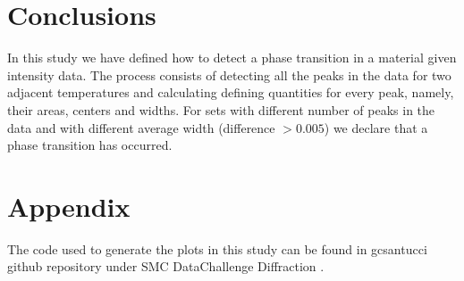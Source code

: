 

\section{Conclusions} \label{Conclusions}
	In this study we have defined how to detect a phase transition in a material given intensity data. The process consists of detecting all the peaks in the data for two adjacent temperatures and calculating defining quantities for every peak, namely, their areas, centers and widths.
	For sets with different number of peaks in the data and with different average width (difference $> 0.005$) we declare that a phase transition has occurred.
	
\section{Appendix}\label{App}
	The code used to generate the plots in this study can be found in gcsantucci github repository under SMC DataChallenge Diffraction \cite{git}.